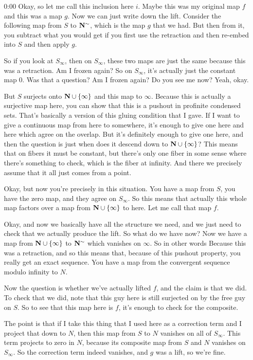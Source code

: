 \begin{unfinished}{0:00}
Okay, so let me call this inclusion here $i$. Maybe this was my original map $f$ and this was a map $g$. Now we can just write down the lift. Consider the following map from $S$ to $\mathbf N^\sim$, which is the map $g$ that we had. But then from it, you subtract what you would get if you first use the retraction and then re-embed into $S$ and then apply $g$.

So if you look at $S_\infty$, then on $S_\infty$, these two maps are just the same because this was a retraction. Am I frozen again? So on $S_\infty$, it's actually just the constant map $0$. Was that a question? Am I frozen again? Do you see me now? Yeah, okay.

But $S$ surjects onto $\mathbf N \cup \{\infty\}$ and this map to $\infty$. Because this is actually a surjective map here, you can show that this is a pushout in profinite condensed sets. That's basically a version of this gluing condition that I gave. If I want to give a continuous map from here to somewhere, it's enough to give one here and here which agree on the overlap. But it's definitely enough to give one here, and then the question is just when does it descend down to $\mathbf N \cup \{\infty\}$? This means that on fibers it must be constant, but there's only one fiber in some sense where there's something to check, which is the fiber at infinity. And there we precisely assume that it all just comes from a point.

Okay, but now you're precisely in this situation. You have a map from $S$, you have the zero map, and they agree on $S_\infty$. So this means that actually this whole map factors over a map from $\mathbf N \cup \{\infty\}$ to here. Let me call that map $f$.

Okay, and now we basically have all the structure we need, and we just need to check that we actually produce the lift. So what do we have now? Now we have a map from $\mathbf N \cup \{\infty\}$ to $\mathbf N^\sim$ which vanishes on $\infty$. So in other words
Because this was a retraction, and so this means that, because of this pushout property, you really get an exact sequence. You have a map from the convergent sequence modulo infinity to $N$.

Now the question is whether we've actually lifted $f$, and the claim is that we did. To check that we did, note that this guy here is still surjected on by the free guy on $S$. So to see that this map here is $f$, it's enough to check for the composite.

The point is that if I take this thing that I used here as a correction term and I project that down to $N$, then this map from $S$ to $N$ vanishes on all of $S_\infty$. This term projects to zero in $N$, because its composite map from $S$ and $N$ vanishes on $S_\infty$. So the correction term indeed vanishes, and $g$ was a lift, so we're fine.


\end{unfinished}
